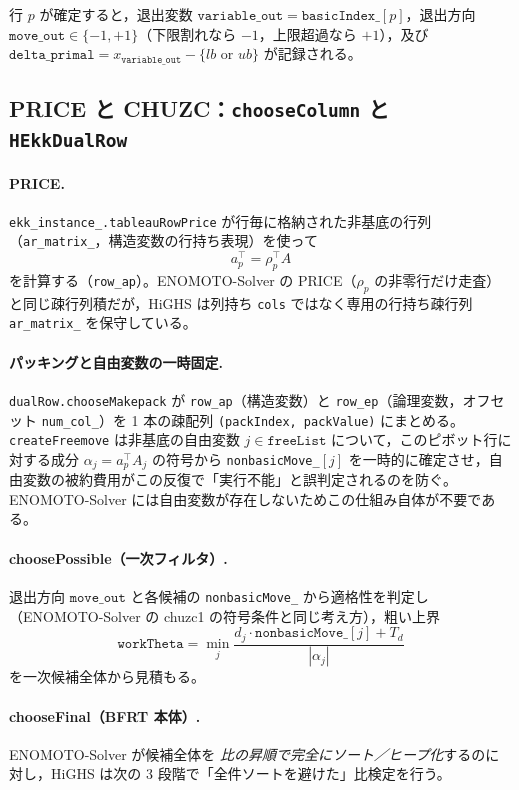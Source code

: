 \documentclass[11pt,a4paper]{ltjsarticle}
\newcommand{\code}[1]{\texttt{#1}}
\begin{document}
行 $p$ が確定すると，退出変数 $\code{variable\_out}=\code{basicIndex\_}[p]$，退出方向 $\code{move\_out}\in\{-1,+1\}$（下限割れなら $-1$，上限超過なら $+1$），及び $\code{delta\_primal} = x_{\code{variable\_out}} - \{lb\text{ or }ub\}$ が記録される。

\subsection{PRICE と CHUZC：\code{chooseColumn} と \code{HEkkDualRow}}

\paragraph{PRICE.} \code{ekk\_instance\_.tableauRowPrice} が行毎に格納された非基底の行列（\code{ar\_matrix\_}，構造変数の行持ち表現）を使って
\[
  a_p^\top = \rho_p^\top A
\]
を計算する（\code{row\_ap}）。ENOMOTO-Solver の PRICE（$\rho_p$ の非零行だけ走査）と同じ疎行列積だが，HiGHS は列持ち \code{cols} ではなく専用の行持ち疎行列 \code{ar\_matrix\_} を保守している。

\paragraph{パッキングと自由変数の一時固定.} \code{dualRow.chooseMakepack} が \code{row\_ap}（構造変数）と \code{row\_ep}（論理変数，オフセット \code{num\_col\_}）を 1 本の疎配列 \code{(packIndex, packValue)} にまとめる。\code{createFreemove} は非基底の自由変数 $j\in\code{freeList}$ について，このピボット行に対する成分 $\alpha_j = a_p^\top A_j$ の符号から \code{nonbasicMove\_}$[j]$ を一時的に確定させ，自由変数の被約費用がこの反復で「実行不能」と誤判定されるのを防ぐ。ENOMOTO-Solver には自由変数が存在しないためこの仕組み自体が不要である。

\paragraph{choosePossible（一次フィルタ）.} 退出方向 $\code{move\_out}$ と各候補の \code{nonbasicMove\_} から適格性を判定し（ENOMOTO-Solver の chuzc1 の符号条件と同じ考え方），粗い上界
\[
  \code{workTheta} = \min_j \frac{d_j\cdot\code{nonbasicMove\_}[j] + T_d}{|\alpha_j|}
\]
を一次候補全体から見積もる。

\paragraph{chooseFinal（BFRT 本体）.} ENOMOTO-Solver が候補全体を \emph{比の昇順で完全にソート／ヒープ化}するのに対し，HiGHS は次の 3 段階で「全件ソートを避けた」比検定を行う。
\end{document}
